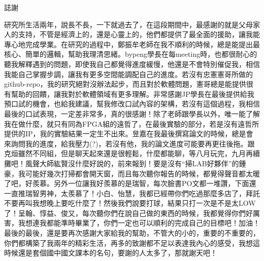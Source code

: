 \begin{titlepage}

\begin{center}
\large{誌謝}
\end{center}
研究所生活兩年，說長不長，一下就過去了，在這段期間中，最感謝的就是父母家人的支持，不管是經濟上的，還是心靈上的，他們都提供了最全面的援助，讓我能專心地完成學業。在研究的過程中，鄭振牟老師在我不順利的時候，總是能提出最核心、簡單的邏輯，幫助我理清思緒。bypeng學長在每meeting時，也都很耐心的聽我解釋遇到的問題，即使我自己都覺得進度緩慢，他還是不會特別催促我，相信我能自己掌握步調，讓我有更多空間能調配自己的進度。若沒有忠憲憲哥所做的github-repo，我的研究絕對沒辦法起步，而且對於軟體問題，憲哥總是能提供很有幫助的回饋，讓我對於軟體領域有更多理解。非常感謝JP學長在最後提供給我預口試的機會，也給我建議，幫我修改口試內容的架構，若沒有這個過程，我相信最後的口試表現，一定差非常多，真的很感謝！除了老師跟學長以外，唯一能了解我在做什麼，就只有同為FPGA組的遠哲了，在最後實驗的部分，若是沒有遠哲所提供的IP，我的實驗結果一定生不出來。昱嘉在我最後撰寫論文的時候，總是會來詢問我的進度，給我壓力(?)，若沒有他，我的論文進度可能要再更往後拖。跟克烜雖然不同組，但是聊天起來還是很輕鬆，什麼都能聊，等八月玩完，九月再續攤吧！風聲大師紘賢沒什麼好說的，前來報到！要是沒有“掃LAB好夥伴”的鍾豪，我可能好幾次打掃都會開天窗，而且每次聽你報告的時候，都覺得聲音都太暖了吧，好羨慕。另外一位讓我好羨慕的是瑞智，每次臉書PO文都一堆讚，下面還一直推瑞智男神，太羨慕了！小白、怡慧，我都已經帶你們吃過那麼多店了，拜託不要再叫我想晚上要吃什麼了！然後我們說要打球，結果只打一次是不是太LOW了！呈翰、惇益、俊又，每次聽你們在說自己做的東西的時候，我都覺得你們好厲害，我想連我都能準時畢業了，你們一定也可以順利的完成自己的目標吧！加油！最後的最後，還是要再次感謝大家給我的幫助，不管大的小的，重要的不重要的，你們都構築了我兩年的精彩生活，再多的致謝都不足以表達我內心的感受，我想這時候還是套個國中國文課本的名句，要謝的人太多了，那就謝天吧！




\end{titlepage}